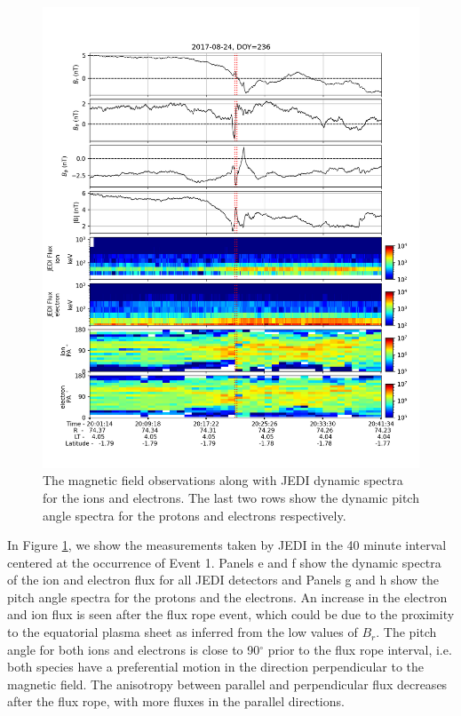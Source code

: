 \begin{figure}
    \centering
    \includegraphics[width=\textwidth]{images6/event-1-jedi.png}
    \caption{The magnetic field observations along with JEDI dynamic spectra for the ions and electrons. The last two rows show the dynamic pitch angle spectra for the protons and electrons respectively.}
    \label{fig:event1-jedi}
\end{figure}

In Figure \ref{fig:event1-jedi}, we show the measurements taken by JEDI in the 40 minute interval centered at the occurrence of Event 1. Panels e and f show the dynamic spectra of the ion and electron flux for all JEDI detectors and Panels g and h show the pitch angle spectra for the protons and the electrons. An increase in the electron and ion flux is seen after the flux rope event, which could be due to the proximity to the equatorial plasma sheet as inferred from the low values of $B_r$. The pitch angle for both ions and electrons is close to 90$^\circ$ prior to the flux rope interval, i.e. both species have a preferential motion in the direction perpendicular to the magnetic field. The anisotropy between parallel and perpendicular flux decreases after the flux rope, with more fluxes in the parallel directions. 


